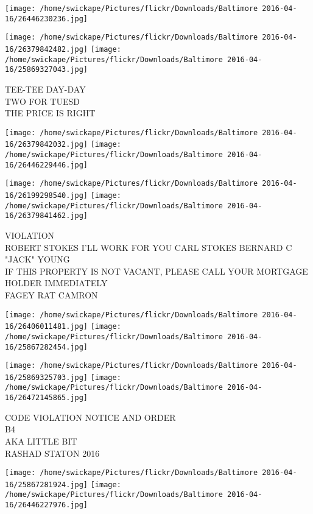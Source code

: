 \documentclass[10pt,letterpaper]{article}
\begin{document}
\texttt{[image: /home/swickape/Pictures/flickr/Downloads/Baltimore 2016-04-16/26446230236.jpg]}

\vspace{0.25in}
\texttt{[image: /home/swickape/Pictures/flickr/Downloads/Baltimore 2016-04-16/26379842482.jpg]}
\texttt{[image: /home/swickape/Pictures/flickr/Downloads/Baltimore 2016-04-16/25869327043.jpg]}

TEE{-}TEE DAY{-}DAY\\
TWO FOR TUESD\\
THE PRICE IS RIGHT\\
\pagebreak

\texttt{[image: /home/swickape/Pictures/flickr/Downloads/Baltimore 2016-04-16/26379842032.jpg]}
\texttt{[image: /home/swickape/Pictures/flickr/Downloads/Baltimore 2016-04-16/26446229446.jpg]}

\texttt{[image: /home/swickape/Pictures/flickr/Downloads/Baltimore 2016-04-16/26199298540.jpg]}
\texttt{[image: /home/swickape/Pictures/flickr/Downloads/Baltimore 2016-04-16/26379841462.jpg]}

VIOLATION\\
ROBERT STOKES I'LL WORK FOR YOU CARL STOKES BERNARD C "JACK" YOUNG\\
IF THIS PROPERTY IS NOT VACANT, PLEASE CALL YOUR MORTGAGE HOLDER IMMEDIATELY\\
FAGEY RAT CAMRON\\
\pagebreak

\texttt{[image: /home/swickape/Pictures/flickr/Downloads/Baltimore 2016-04-16/26406011481.jpg]}
\texttt{[image: /home/swickape/Pictures/flickr/Downloads/Baltimore 2016-04-16/25867282454.jpg]}

\texttt{[image: /home/swickape/Pictures/flickr/Downloads/Baltimore 2016-04-16/25869325703.jpg]}
\texttt{[image: /home/swickape/Pictures/flickr/Downloads/Baltimore 2016-04-16/26472145865.jpg]}

CODE VIOLATION NOTICE AND ORDER\\
B4\\
AKA LITTLE BIT\\
RASHAD STATON 2016\\
\pagebreak

\texttt{[image: /home/swickape/Pictures/flickr/Downloads/Baltimore 2016-04-16/25867281924.jpg]}
\texttt{[image: /home/swickape/Pictures/flickr/Downloads/Baltimore 2016-04-16/26446227976.jpg]}
\end{document}
